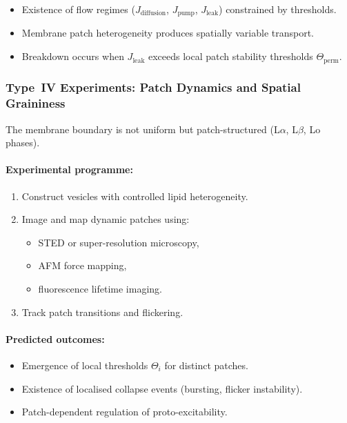 \begin{itemize}
    \item Existence of flow regimes ($J_{\mathrm{diffusion}}$,
          $J_{\mathrm{pump}}$, $J_{\mathrm{leak}}$) constrained by thresholds.
    \item Membrane patch heterogeneity produces spatially variable transport.
    \item Breakdown occurs when
          $J_{\mathrm{leak}}$ exceeds local patch stability thresholds
          $\Theta_{\mathrm{perm}}$.
\end{itemize}



\subsubsection{Type~IV Experiments: Patch Dynamics and Spatial Graininess}

The membrane boundary is not uniform but patch-structured (L$\alpha$, L$\beta$,
Lo phases).

\paragraph{Experimental programme:}

\begin{enumerate}
    \item Construct vesicles with controlled lipid heterogeneity.
    \item Image and map dynamic patches using:
          \begin{itemize}
              \item STED or super-resolution microscopy,
              \item AFM force mapping,
              \item fluorescence lifetime imaging.
          \end{itemize}
    \item Track patch transitions and flickering.
\end{enumerate}

\paragraph{Predicted outcomes:}

\begin{itemize}
    \item Emergence of local thresholds $\Theta_i$ for distinct patches.
    \item Existence of localised collapse events (bursting, flicker instability).
    \item Patch-dependent regulation of proto-excitability.
\end{itemize}



